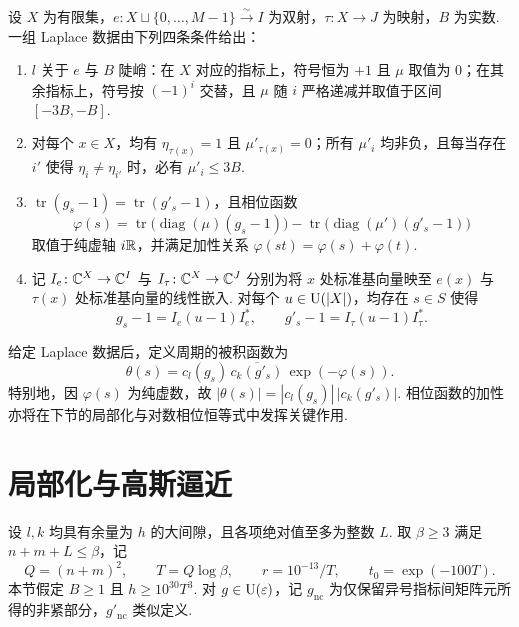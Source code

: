 \begin{definition}[Laplace 数据]
\label{def:ch8-laplace-datum}
\emitthmsource
设 $X$ 为有限集，$e\colon X\sqcup\{0,\ldots,M-1\}\xrightarrow{\sim} I$ 为双射，$\tau\colon X\to J$ 为映射，$B$ 为实数. 一组 Laplace 数据由下列四条条件给出：
\begin{enumerate}
\item $l$ 关于 $e$ 与 $B$ 陡峭：在 $X$ 对应的指标上，符号恒为 $+1$ 且 $\mu$ 取值为 $0$；在其余指标上，符号按 $(-1)^i$ 交替，且 $\mu$ 随 $i$ 严格递减并取值于区间 $[-3B,-B]$.
\item 对每个 $x\in X$，均有 $\eta_{\tau(x)}=1$ 且 $\mu'_{\tau(x)}=0$；所有 $\mu'_i$ 均非负，且每当存在 $i'$ 使得 $\eta_i\ne\eta_{i'}$ 时，必有 $\mu'_i\le 3B$.
\item $\operatorname{tr}(g_s-1)=\operatorname{tr}(g'_s-1)$，且相位函数
\begin{equation}
\label{eq:ch8-phase}
\varphi(s)=\operatorname{tr}\bigl(\operatorname{diag}(\mu)(g_s-1)\bigr)
           -\operatorname{tr}\bigl(\operatorname{diag}(\mu')(g'_s-1)\bigr)
\end{equation}
取值于纯虚轴 $i\mathbb{R}$，并满足加性关系 $\varphi(st)=\varphi(s)+\varphi(t)$.
\item 记 $I_e\colon\mathbb{C}^X\to\mathbb{C}^I$ 与 $I_\tau\colon\mathbb{C}^X\to\mathbb{C}^J$ 分别为将 $x$ 处标准基向量映至 $e(x)$ 与 $\tau(x)$ 处标准基向量的线性嵌入. 对每个 $u\in \operatorname{U}(|X|)$，均存在 $s\in S$ 使得
\[
 g_s-1=I_e(u-1)I_e^*,\qquad
 g'_s-1=I_\tau(u-1)I_\tau^* .
\]
\end{enumerate}
\end{definition}

给定 Laplace 数据后，定义周期的被积函数为
\begin{equation}
\label{eq:ch8-integrand}
  \theta(s)=c_l(g_s)\,\overline{c_k(g'_s)}\,\exp(-\varphi(s)).
\end{equation}
特别地，因 $\varphi(s)$ 为纯虚数，故 $|\theta(s)|=|c_l(g_s)|\,|c_k(g'_s)|$. 相位函数的加性亦将在下节的局部化与对数相位恒等式中发挥关键作用.

\section{局部化与高斯逼近}
\label{sec:ch8-gaussian}

设 $l,k$ 均具有余量为 $h$ 的大间隙，且各项绝对值至多为整数 $L$. 取 $\beta\ge 3$ 满足 $n+m+L\le\beta$，记
\[
Q=(n+m)^2,\qquad T=Q\log\beta,\qquad
r=10^{-13}/T,\qquad t_0=\exp(-100T).
\]
本节假定 $B\ge1$ 且 $h\ge10^{30}T^3$. 对 $g\in \operatorname{U}(\varepsilon)$，记 $g_{\mathrm{nc}}$ 为仅保留异号指标间矩阵元所得的非紧部分，$g'_{\mathrm{nc}}$ 类似定义.

